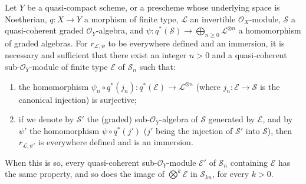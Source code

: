 \begin{proposition}[3.8.5]
\label{II.3.8.5}
Let $Y$ be a quasi-compact scheme, or a prescheme whose underlying space
is Noetherian, $q:X\to Y$ a morphism \textup{of finite type}, $\mathcal{L}$ an
invertible $\mathcal{O}_X$-module, $\mathcal{S}$ a quasi-coherent graded
$\mathcal{O}_Y$-algebra, and
$\psi:q^*(\mathcal{S})\to\bigoplus_{n\geq0}\mathcal{L}^{\otimes n}$ a
homomorphism of graded algebras. For $r_{\mathcal{L},\psi}$ to be
everywhere defined and an immersion, it is necessary and sufficient that
there exist an integer $n>0$ and a quasi-coherent sub-$\mathcal{O}_Y$-module \textup{of
finite type} $\mathcal{E}$ of $\mathcal{S}_n$ such that:
\begin{enumerate}
  \item[\textup{a)}] the homomorphism
    $\psi_n\circ q^*(j_n):q^*(\mathcal{E})\to\mathcal{L}^{\otimes n}$
    (where $j_n:\mathcal{E}\to\mathcal{S}$ is the canonical injection) is
    surjective;
  \item[\textup{b)}] if we denote by $\mathcal{S}'$ the (graded)
    sub-$\mathcal{O}_Y$-algebra of $\mathcal{S}$ generated by $\mathcal{E}$, and
    by $\psi'$ the homomorphism $\psi\circ q^*(j')$ ($j'$ being the injection
    of $\mathcal{S}'$ into $\mathcal{S}$), then $r_{\mathcal{L},\psi'}$ is
    everywhere defined and is an immersion.
\end{enumerate}

When this is so, every quasi-coherent sub-$\mathcal{O}_Y$-module
$\mathcal{E}'$ of $\mathcal{S}_n$ containing $\mathcal{E}$ has the same
property, and so does the image of $\bigotimes^k\mathcal{E}$ in
$\mathcal{S}_{kn}$, for every $k>0$.
\end{proposition}

